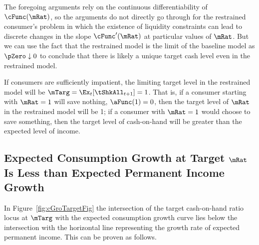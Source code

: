\documentclass[BufferStockTheory]{subfiles}
\begin{document}

The foregoing arguments rely on the continuous differentiability of
$\cFunc(\mRat)$, so the arguments do not directly go through for the
restrained consumer's problem in which the existence of liquidity
constraints can lead to discrete changes in the slope
$\cFunc^{\prime}(\mRat)$ at particular values of $\mRat$. But we can
use the fact that the restrained model is the limit of the baseline
model as $\pZero \downarrow 0$ to conclude that there is likely a
unique target cash level even in the restrained model.

If consumers are sufficiently impatient, the limiting target level in the
restrained model will be $\mTarg = \Ex_{t}[{\tShkAll}_{t+1}] = 1$. That
is, if a consumer starting with $\mRat = 1$ will save nothing, ${\aFunc}(1)=0$,
then the target level of $\mRat$ in the restrained model will be 1; if a
consumer with $\mRat=1$ would choose to save something, then the target
level of cash-on-hand will be greater than the expected level of income.

\hypertarget{cGroLTpGro}{}
\subsection{Expected Consumption Growth at Target $\mRat$ Is Less than
  Expected Permanent Income Growth}

\label{subsec:expcgrowth} In Figure~\ref{fig:cGroTargetFig} the intersection of
the target cash-on-hand ratio locus at $\mTarg$ with the expected consumption
growth curve lies below the intersection with the horizontal line
representing the growth rate of expected permanent income. This can be
proven as follows.
\end{document}

